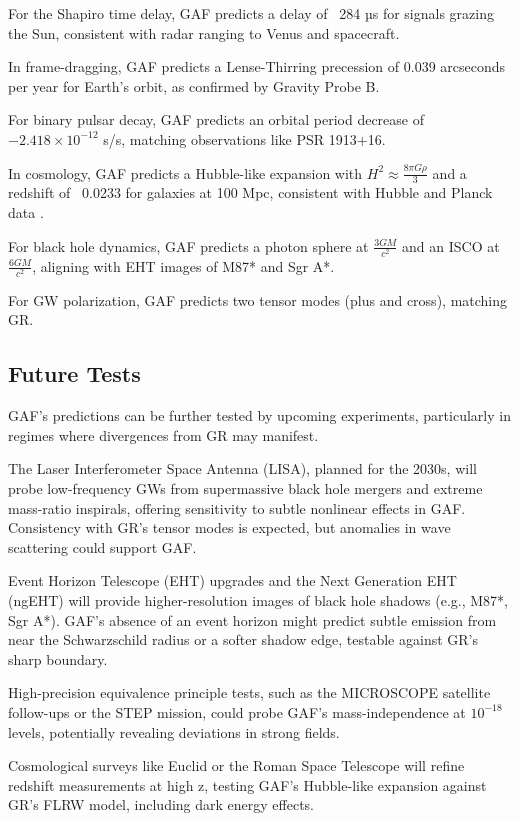 \documentclass{article}
\begin{document}
For the Shapiro time delay, GAF predicts a delay of ~284 µs for signals grazing the Sun, consistent with radar ranging to Venus and spacecraft.

In frame-dragging, GAF predicts a Lense-Thirring precession of 0.039 arcseconds per year for Earth's orbit, as confirmed by Gravity Probe B.

For binary pulsar decay, GAF predicts an orbital period decrease of \( -2.418 \times 10^{-12} \) s/s, matching observations like PSR 1913+16.

In cosmology, GAF predicts a Hubble-like expansion with \( H^2 \approx \frac{8 \pi G \rho}{3} \) and a redshift of ~0.0233 for galaxies at 100 Mpc, consistent with Hubble and Planck data \cite{Riess2019}\cite{Planck2018}.

For black hole dynamics, GAF predicts a photon sphere at \( \frac{3 G M}{c^2} \) and an ISCO at ~ \( \frac{6 G M}{c^2} \), aligning with EHT images of M87* and Sgr A*.

For GW polarization, GAF predicts two tensor modes (plus and cross), matching GR.

\subsection{Future Tests}

GAF's predictions can be further tested by upcoming experiments, particularly in regimes where divergences from GR may manifest.

The Laser Interferometer Space Antenna (LISA), planned for the 2030s, will probe low-frequency GWs from supermassive black hole mergers and extreme mass-ratio inspirals, offering sensitivity to subtle nonlinear effects in GAF. Consistency with GR's tensor modes is expected, but anomalies in wave scattering could support GAF.

Event Horizon Telescope (EHT) upgrades and the Next Generation EHT (ngEHT) will provide higher-resolution images of black hole shadows (e.g., M87*, Sgr A*). GAF's absence of an event horizon might predict subtle emission from near the Schwarzschild radius or a softer shadow edge, testable against GR's sharp boundary.

High-precision equivalence principle tests, such as the MICROSCOPE satellite follow-ups or the STEP mission, could probe GAF's mass-independence at \( 10^{-18} \) levels, potentially revealing deviations in strong fields.

Cosmological surveys like Euclid or the Roman Space Telescope will refine redshift measurements at high z, testing GAF's Hubble-like expansion against GR's FLRW model, including dark energy effects.
\end{document}
